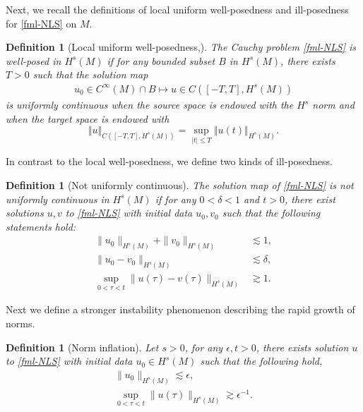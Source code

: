 \documentclass[10pt,a4paper]{amsart}
\numberwithin{equation}{section}
\newtheorem{definition}[theorem]{Definition}
\begin{document}
Next, we recall the definitions of local uniform well-posedness and ill-posedness for \eqref{fml-NLS} on $M$.
\begin{definition}[Local uniform well-posedness,\cite{CCT-03}]\label{def-well-pose}
The Cauchy problem \eqref{fml-NLS} is  well-posed in $H^s(M)$ if for any bounded subset $B$ in $H^s(M)$, there exists $T>0$ such that the solution map
\begin{align*}
u_0\in C^\infty(M)\cap B\mapsto u\in C(\left[-T,T\right],H^s(M))
\end{align*} 
is uniformly continuous when the source space is endowed with the $H^s$ norm and when the target space is endowed with
\begin{equation*}
\Vert u\Vert_{C(\left[-T,T\right],H^s(M))}=\sup_{\left|t\right|\leqslant T}\Vert u(t)\Vert_{H^s(M)}.
\end{equation*} 
\end{definition}
In contrast to the local well-posedness, we define two kinds of ill-posedness.
\begin{definition}[Not uniformly continuous]\label{def-ill-pose-weak}
The solution map of \eqref{fml-NLS} is not uniformly continuous in $H^s(M)$ if for any $0<\delta<1$ and $t>0$, there exist solutions $u,v$ to \eqref{fml-NLS} with initial data $u_0,v_0$ such that the following statements hold:
\begin{equation*}
\begin{aligned}
\|u_0\|_{H^s(M)} + \|v_0\|_{H^s(M)} &\lesssim 1,\\
\|u_0-v_0\|_{H^s(M)} &\lesssim \delta,\\
\sup_{0<\tau<t}\|u(\tau)-v(\tau)\|_{H^s(M)} &\gtrsim 1.
\end{aligned}
\end{equation*} 
\end{definition}
Next we define a stronger instability phenomenon describing  the rapid growth of norms.

\begin{definition}[Norm inflation]\label{def-strong-ill-posedness}
Let $s>0$, for any $\epsilon,t>0$, there exists solution $u$ to \eqref{fml-NLS} with initial data $u_0\in H^s(M)$ such that the following hold,
\begin{equation*}
\begin{gathered}
\|u_0\|_{H^s(M)} \lesssim \epsilon,\\
\sup_{0<\tau<t}\|u(\tau)\|_{H^s(M)} \gtrsim \epsilon^{-1}.
\end{gathered}
\end{equation*}
\end{definition}
	
\end{document}
